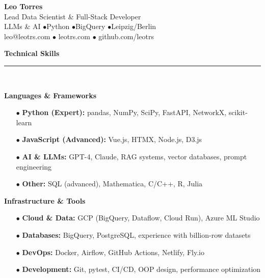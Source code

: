 \documentclass[11pt,a4paper]{article}
\newcommand{\sectiondivider}{%
    \vspace{2pt}\\%
    {\color{verdigris}\rule{30pt}{2pt}}\\%
    \vspace{8pt}%
}
\newcommand{\verdigrisbullet}{{\color{verdigris}$\bullet$}\space}
\newcommand{\cvsectioncustom}[1]{%
    \vspace{12pt}%
    {\Large\color{navy}\textbf{#1}}%
    \sectiondivider%
}
\begin{document}
\color{charcoal}

\begin{center}
    {\Huge\color{navy}\textbf{Leo Torres}}\\[8pt]
    {\large\color{mediumgray}Lead Data Scientist \& Full-Stack Developer}\\[4pt]
    {LLMs \& AI \verdigrisbullet Python \verdigrisbullet BigQuery \verdigrisbullet Leipzig/Berlin}\\[12pt]
    {\small
        leo@leotrs.com \verdigrisbullet 
        leotrs.com \verdigrisbullet 
        github.com/leotrs
    }\\[8pt]
\end{center}

\vspace{15pt}

\cvsectioncustom{Technical Skills}

\textbf{Languages \& Frameworks}
\begin{itemize}[leftmargin=15pt,itemsep=2pt]
    \item[\verdigrisbullet] \textbf{Python (Expert):} pandas, NumPy, SciPy, FastAPI, NetworkX, scikit-learn
    \item[\verdigrisbullet] \textbf{JavaScript (Advanced):} Vue.js, HTMX, Node.js, D3.js
    \item[\verdigrisbullet] \textbf{AI \& LLMs:} GPT-4, Claude, RAG systems, vector databases, prompt engineering
    \item[\verdigrisbullet] \textbf{Other:} SQL (advanced), Mathematica, C/C++, R, Julia
\end{itemize}

\vspace{6pt}
\textbf{Infrastructure \& Tools}
\begin{itemize}[leftmargin=15pt,itemsep=2pt]
    \item[\verdigrisbullet] \textbf{Cloud \& Data:} GCP (BigQuery, Dataflow, Cloud Run), Azure ML Studio
    \item[\verdigrisbullet] \textbf{Databases:} BigQuery, PostgreSQL, experience with billion-row datasets
    \item[\verdigrisbullet] \textbf{DevOps:} Docker, Airflow, GitHub Actions, Netlify, Fly.io
    \item[\verdigrisbullet] \textbf{Development:} Git, pytest, CI/CD, OOP design, performance optimization
\end{itemize}
\end{document}
